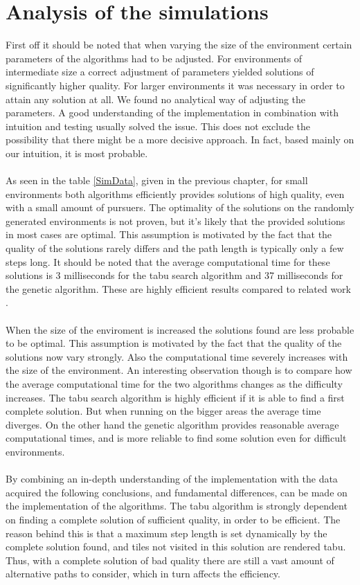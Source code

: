 \section{Analysis of the simulations}
First off it should be noted that when varying the size of the environment certain parameters of the algorithms had to be adjusted. For environments of intermediate size a correct adjustment of parameters yielded solutions of significantly higher quality. For larger environments it was necessary in order to attain any solution at all. We found no analytical way of adjusting the parameters. A good understanding of the implementation in combination with intuition and testing usually solved the issue. This does not exclude the possibility that there might be a more decisive approach. In fact, based mainly on our intuition, it is most probable.\\
\\As seen in the table \ref{SimData}, given in the previous chapter, for small environments both algorithms efficiently provides solutions of high quality, even with a small amount of pursuers. The optimality of the solutions on the randomly generated environments is not proven, but it's likely that the provided solutions in most cases are optimal. This assumption is motivated by the fact that the quality of the solutions rarely differs and the path length is typically only a few steps long. It should be noted that the average computational time for these solutions is 3 milliseconds for the tabu search algorithm and 37 milliseconds for the genetic algorithm. These are highly efficient results compared to related work \cite{paper1}.\\%
\\When the size of the enviroment is increased the solutions found are less probable to be optimal. This assumption is motivated by the fact that the quality of the solutions now vary strongly. Also the computational time severely increases with the size of the environment. An interesting observation though is to compare how the average computational time for the two algorithms changes as the difficulty increases. The tabu search algorithm is highly efficient if it is able to find a first complete solution. But when running on the bigger areas the average time diverges. On the other hand the genetic algorithm provides reasonable average computational times, and is more reliable to find some solution even for difficult environments.\\
\\By combining an in-depth understanding of the implementation with the data acquired the following conclusions, and fundamental differences, can be made on the implementation of the algorithms. The tabu algorithm is strongly dependent on finding a complete solution of sufficient quality, in order to be efficient. The reason behind this is that a maximum step length is set dynamically by the complete solution found, and tiles not visited in this solution are rendered tabu. Thus, with a complete solution of bad quality there are still a vast amount of alternative paths to consider, which in turn affects the efficiency.\\
